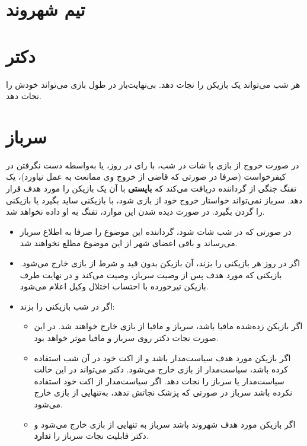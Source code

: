 \documentclass[12pt]{extarticle}
\begin{document}
\clearpage
{}
\section*{تیم شهروند}
\section{دکتر}
هر شب می‌تواند یک بازیکن را نجات دهد. بی‌نهایت‌بار در طول بازی می‌تواند خودش را نجات دهد.

\section{سرباز}
در صورت خروج از بازی با شات در شب، با رای در روز، یا به‌واسطه‌ دست نگرفتن در کیفرخواست (صرفا در صورتی که قاضی از خروج وی ممانعت به عمل نیاورد)، یک تفنگ جنگی از گرداننده دریافت می‌کند که
\textbf{بایستی}
با آن یک بازیکن را مورد هدف قرار دهد. سرباز نمی‌تواند خواستار خروج خود از بازی شود، با بازیکنی ساید بگیرد یا بازیکنی را گردن بگیرد. در صورت دیده شدن این موارد، تفنگ به او داده نخواهد شد.
\begin{itemize}
	\item
	      در صورتی که در شب شات شود، گرداننده این موضوع را صرفا به اطلاع سرباز می‌رساند و باقی اعضای شهر از این موضوع مطلع نخواهند شد.
	\item
	      اگر در روز هر بازیکنی را بزند، آن بازیکن بدون قید و شرط از بازی خارج می‌شود.
	      بازیکنی که مورد هدف پس از وصیت سرباز، وصیت می‌کند و در نهایت طرف بازیکن تیرخورده با احتساب اختلال وکیل اعلام می‌شود.
	\item
	      اگر در شب بازیکنی را بزند:
	      \begin{itemize}
		      \item
		            اگر بازیکن زده‌شده مافیا باشد، سرباز و مافیا از بازی خارج خواهند شد. در این صورت نجات دکتر روی سرباز و مافیا موثر خواهد بود.
		      \item
		            اگر بازیکن مورد هدف سیاست‌مدار باشد و از اکت خود در آن شب استفاده کرده باشد، سیاست‌مدار از بازی خارج می‌شود. دکتر می‌تواند در این حالت سیاست‌مدار یا سرباز را نجات دهد. اگر سیاست‌مدار از اکت خود استفاده نکرده باشد سرباز در صورتی که پزشک نجاتش ندهد، به‌تنهایی از بازی خارج می‌شود.
		      \item
		            اگر بازیکن مورد هدف شهروند باشد سرباز به تنهایی از بازی خارج می‌شود و دکتر قابلیت نجات سرباز را \textbf{ندارد}.
	      \end{itemize}
\end{itemize}
\end{document}
